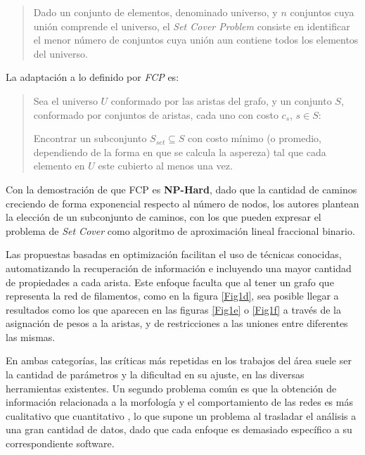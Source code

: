 \documentclass{article}
\begin{document}
\begin{quote}
Dado un conjunto de elementos, denominado universo, y $n$ conjuntos cuya unión comprende el universo, el {\it Set Cover Problem} consiste en identificar el menor n\'umero de conjuntos cuya unión aun contiene todos los elementos del universo.
\end{quote}

La adaptaci\'on a lo definido por {\it FCP} es: 
\begin{quote}
Sea el universo $U$ conformado por las aristas del grafo, y un conjunto $S$, conformado por conjuntos de aristas, cada uno con costo $c_s$, $s \in S$:

Encontrar un subconjunto $S_{set} \subseteq S$ con costo m\'inimo (o promedio, dependiendo de la forma en que se calcula la aspereza) tal que cada elemento en $U$ este cubierto al menos una vez.
\end{quote}

Con la demostraci\'on de que FCP es {\bf NP-Hard}, dado que la cantidad de caminos creciendo de forma exponencial respecto al n\'umero de nodos, los autores plantean la elecci\'on de un subconjunto de caminos, con los que pueden expresar el problema de {\it Set Cover} como algoritmo de aproximaci\'on lineal fraccional binario.


\bigskip
Las propuestas basadas en optimizaci\'on facilitan el uso de t\'ecnicas conocidas, automatizando la recuperaci\'on de informaci\'on e incluyendo una mayor cantidad de propiedades a cada arista. Este enfoque faculta que al tener un grafo que representa la red de filamentos, como en la figura \ref{Fig1d}, sea posible llegar a resultados como los que aparecen en las figuras \ref{Fig1e} o \ref{Fig1f} a trav\'es de la asignaci\'on de pesos a la aristas, y de restricciones a las uniones entre diferentes las mismas.

En ambas categor\'ias, las cr\'iticas m\'as repetidas en los trabajos del \'area suele ser la cantidad de par\'ametros y la dificultad en su ajuste, en las diversas herramientas existentes. Un segundo problema com\'un es que la obtenci\'on de informaci\'on relacionada a la morfolog\'ia y el comportamiento de las redes es m\'as cualitativo que cuantitativo \cite{asgharzadeh2018computational}\cite{qiu2014quantitative}, lo que supone un problema al trasladar el  an\'alisis a una gran cantidad de datos, dado que cada enfoque es demasiado espec\'ifico a su correspondiente software.
\end{document}

